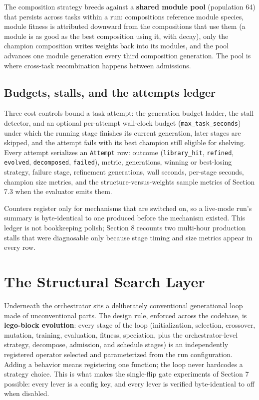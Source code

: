 \documentclass[11pt]{article}
\begin{document}
The composition strategy breeds against a \textbf{shared module pool} (population 64) that persists across tasks within a run: compositions reference module species, module fitness is attributed downward from the compositions that use them (a module is as good as the best composition using it, with decay), only the champion composition writes weights back into its modules, and the pool advances one module generation every third composition generation. The pool is where cross-task recombination happens between admissions.

\subsection{Budgets, stalls, and the attempts ledger}

Three cost controls bound a task attempt: the generation budget ladder, the stall detector, and an optional per-attempt wall-clock budget (\texttt{max_task_seconds}) under which the running stage finishes its current generation, later stages are skipped, and the attempt fails with its best champion still eligible for shelving. Every attempt serializes an \texttt{Attempt} row: outcome (\texttt{library_hit}, \texttt{refined}, \texttt{evolved}, \texttt{decomposed}, \texttt{failed}), metric, generations, winning or best-losing strategy, failure stage, refinement generations, wall seconds, per-stage seconds, champion size metrics, and the structure-versus-weights sample metrics of Section 7.3 when the evaluator emits them.

Counters register only for mechanisms that are switched on, so a live-mode run's summary is byte-identical to one produced before the mechanism existed. This ledger is not bookkeeping polish; Section 8 recounts two multi-hour production stalls that were diagnosable only because stage timing and size metrics appear in every row.

\section{The Structural Search Layer}

Underneath the orchestrator sits a deliberately conventional generational loop made of unconventional parts. The design rule, enforced across the codebase, is \textbf{lego-block evolution}: every stage of the loop (initialization, selection, crossover, mutation, training, evaluation, fitness, speciation, plus the orchestrator-level strategy, decompose, admission, and schedule stages) is an independently registered operator selected and parameterized from the run configuration. Adding a behavior means registering one function; the loop never hardcodes a strategy choice. This is what makes the single-flip gate experiments of Section 7 possible: every lever is a config key, and every lever is verified byte-identical to off when disabled.
\end{document}

